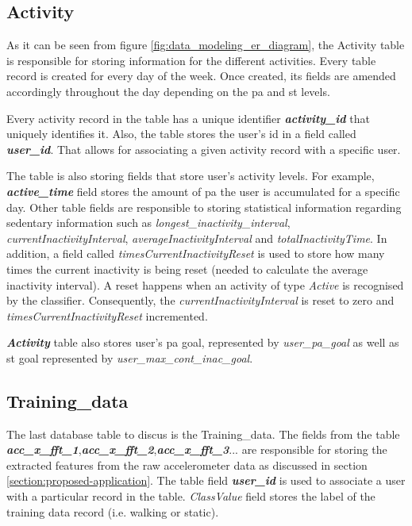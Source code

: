         \subsection{Activity}
        As it can be seen from figure \ref{fig:data_modeling_er_diagram}, the Activity table is responsible for storing information for the different activities. Every table record is created for every day of the week. Once created, its fields are amended accordingly throughout the day depending on the \gls{pa} and \gls{st} levels. 
        
        Every activity record in the table has a unique identifier \textbf{\textit{activity\_id}} that uniquely identifies it. Also, the table stores the user's id in a field called \textbf{\textit{user\_id}}. That allows for associating a given activity record with a specific user.
        
        The table is also storing fields that store user's activity levels. For example, \textbf{\textit{active\_time}} field stores the amount of \gls{pa} the user is accumulated for a specific day. Other table fields are responsible to storing statistical information regarding sedentary information such as \textit{longest\_inactivity\_interval}, \textit{currentInactivityInterval}, \textit{averageInactivityInterval} and \textit{totalInactivityTime}. In addition, a field called \textit{timesCurrentInactivityReset} is used to store how many times the current inactivity is being reset (needed to calculate the average inactivity interval). A reset happens when an activity of type \textit{Active} is recognised by the classifier. Consequently, the \textit{currentInactivityInterval} is reset to zero and \textit{timesCurrentInactivityReset} incremented.
        
        \textbf{\textit{Activity}} table also stores user's \gls{pa} goal, represented by \textit{user\_pa\_goal} as well as \gls{st} goal represented by \textit{user\_max\_cont\_inac\_goal}.
        
        \subsection{Training\_data}
        The last database table to discus is the Training\_data. The fields from the table \textbf{\textit{acc\_x\_fft\_1}},\newline\textbf{\textit{acc\_x\_fft\_2}},\textbf{\textit{acc\_x\_fft\_3}}... are responsible for storing the extracted features from the raw accelerometer data as discussed in section \ref{section:proposed-application}. The table field \textbf{\textit{user\_id}} is used to associate a user with a particular record in the table. \textit{ClassValue} field stores the label of the training data record (i.e. walking or static).
        

